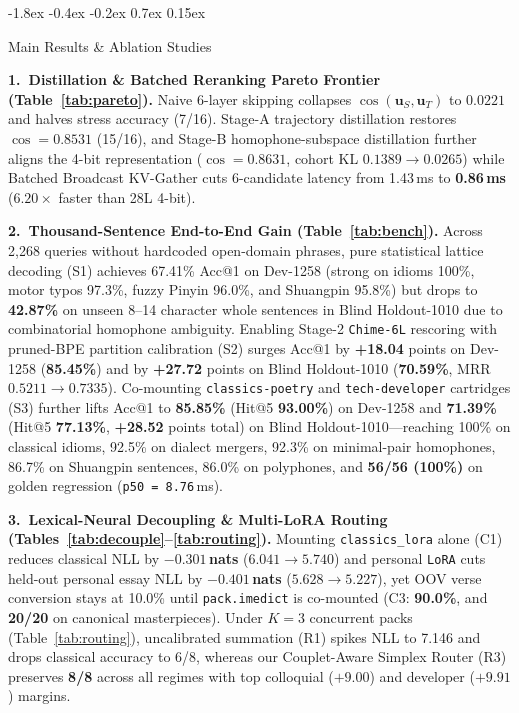 \documentclass[10pt,twocolumn,letterpaper]{article}
\makeatletter
\renewcommand\subsection{\@startsection{subsection}{2}{\z@}%
  {-1.8ex \@plus -0.4ex \@minus -0.2ex}%
  {0.7ex \@plus 0.15ex}%
  {\normalfont\normalsize\fontsize{10.8}{13}\selectfont\bfseries\raggedright}}
\makeatother
\begin{document}
\subsection{Main Results \& Ablation Studies}

\textbf{1.\ Distillation \& Batched Reranking Pareto Frontier (Table~\ref{tab:pareto}).} Naive 6-layer skipping collapses $\cos(\bm{u}_S, \bm{u}_T)$ to $0.0221$ and halves stress accuracy (7/16). Stage-A trajectory distillation restores $\cos = 0.8531$ (15/16), and Stage-B homophone-subspace distillation further aligns the 4-bit representation ($\cos = \mathbf{0.8631}$, cohort KL $0.1389 \to 0.0265$) while Batched Broadcast KV-Gather cuts 6-candidate latency from 1.43\,ms to \textbf{0.86\,ms} ($6.20\times$ faster than 28L 4-bit).

\textbf{2.\ Thousand-Sentence End-to-End Gain (Table~\ref{tab:bench}).} Across 2,268 queries without hardcoded open-domain phrases, pure statistical lattice decoding (S1) achieves 67.41\% Acc@1 on Dev-1258 (strong on idioms 100\%, motor typos 97.3\%, fuzzy Pinyin 96.0\%, and Shuangpin 95.8\%) but drops to \textbf{42.87\%} on unseen 8--14 character whole sentences in Blind Holdout-1010 due to combinatorial homophone ambiguity. Enabling Stage-2 \texttt{Chime-6L} rescoring with pruned-BPE partition calibration (S2) surges Acc@1 by \textbf{+18.04} points on Dev-1258 (\textbf{85.45\%}) and by \textbf{+27.72} points on Blind Holdout-1010 (\textbf{70.59\%}, MRR $0.5211 \to 0.7335$). Co-mounting \texttt{classics-poetry} and \texttt{tech-developer} cartridges (S3) further lifts Acc@1 to \textbf{85.85\%} (Hit@5 \textbf{93.00\%}) on Dev-1258 and \textbf{71.39\%} (Hit@5 \textbf{77.13\%}, \textbf{+28.52} points total) on Blind Holdout-1010---reaching 100\% on classical idioms, 92.5\% on dialect mergers, 92.3\% on minimal-pair homophones, 86.7\% on Shuangpin sentences, 86.0\% on polyphones, and \textbf{56/56 (100\%)} on golden regression (\texttt{p50 = 8.76}\,ms).

\textbf{3.\ Lexical-Neural Decoupling \& Multi-LoRA Routing (Tables~\ref{tab:decouple}--\ref{tab:routing}).} Mounting \texttt{classics\_lora} alone (C1) reduces classical NLL by \textbf{$-0.301$\,nats} ($6.041 \to 5.740$) and personal \texttt{LoRA} cuts held-out personal essay NLL by \textbf{$-0.401$\,nats} ($5.628 \to 5.227$), yet OOV verse conversion stays at 10.0\% until \texttt{pack.imedict} is co-mounted (C3: \textbf{90.0\%}, and \textbf{20/20} on canonical masterpieces). Under $K=3$ concurrent packs (Table~\ref{tab:routing}), uncalibrated summation (R1) spikes NLL to 7.146 and drops classical accuracy to 6/8, whereas our Couplet-Aware Simplex Router (R3) preserves \textbf{8/8} across all regimes with top colloquial ($+9.00$) and developer ($+9.91$) margins.
\end{document}
